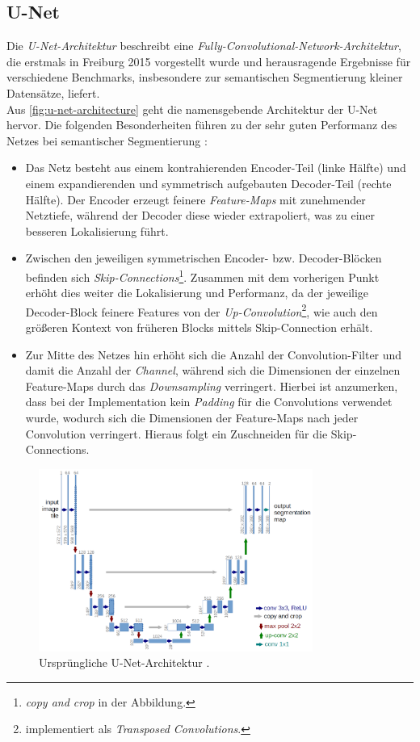 \subsection{U-Net}

Die \textit{U-Net-Architektur} beschreibt eine \textit{Fully-Convolutional-Network-Architektur}, die erstmals in Freiburg 2015 vorgestellt wurde 
und herausragende Ergebnisse für verschiedene Benchmarks, insbesondere zur semantischen Segmentierung kleiner Datensätze, liefert. \\
Aus \autoref{fig:u-net-architecture} geht die namensgebende Architektur der U-Net hervor. Die folgenden Besonderheiten 
führen zu der sehr guten Performanz des Netzes bei semantischer Segmentierung \cite{Ronneberger.18052015}:
\begin{itemize}
	\item Das Netz besteht aus einem kontrahierenden Encoder-Teil (linke Hälfte) und einem expandierenden und symmetrisch aufgebauten
	Decoder-Teil (rechte Hälfte). Der Encoder erzeugt feinere \textit{Feature-Maps} mit zunehmender Netztiefe, 
	während der Decoder diese wieder extrapoliert, was zu einer besseren Lokalisierung führt. 
	\item Zwischen den jeweiligen symmetrischen Encoder- bzw. Decoder-Blöcken befinden sich \textit{Skip-Connections}\footnote{\textit{copy and crop} in der Abbildung.}.
	Zusammen mit dem vorherigen Punkt erhöht dies weiter die Lokalisierung und Performanz, da der jeweilige Decoder-Block feinere Features von der \textit{Up-Convolution}\footnote{implementiert als \textit{Transposed Convolutions}.},
	wie auch den größeren Kontext von früheren Blocks mittels Skip-Connection erhält. 
	\item Zur Mitte des Netzes hin erhöht sich die Anzahl der Convolution-Filter und damit die Anzahl der \textit{Channel}, 
	während sich die Dimensionen der einzelnen Feature-Maps durch das \textit{Downsampling} verringert. 
	Hierbei ist anzumerken, dass bei der Implementation kein \textit{Padding} für die Convolutions verwendet wurde,
	wodurch sich die Dimensionen der Feature-Maps nach jeder Convolution verringert. 
	Hieraus folgt ein Zuschneiden für die Skip-Connections. 
\end{itemize}

\begin{figure}
	\centering
	\includegraphics[width=0.8\textwidth]{Bilder/u-net-architecture.png} 
	\caption{Ursprüngliche U-Net-Architektur \cite{Ronneberger.18052015}.}
	\label{fig:u-net-architecture}
\end{figure} 


